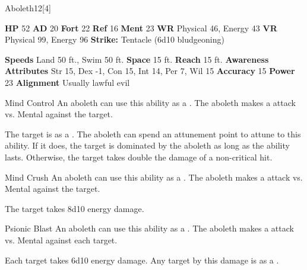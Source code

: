 \begin{monsection}{Aboleth}{12}[4]
    \begin{spellcontent}
      \begin{spelltargetinginfo}
        \pari \textbf{HP} 52 \monsep
          \textbf{AD} 20 \monsep
          \textbf{Fort} 22 \monsep
          \textbf{Ref} 16 \monsep
          \textbf{Ment} 23
        \pari \textbf{WR} Physical 46, Energy 43 \monsep
        \textbf{VR} Physical 99, Energy 96
        \pari \textbf{Strike:}
            Tentacle  (6d10 bludgeoning)
      \end{spelltargetinginfo}
    \end{spellcontent}
    \begin{monsterfooter}
      \pari \textbf{Speeds} Land 50 ft., Swim 50 ft. \monsep
        \textbf{Space} 15 ft. \monsep
        \textbf{Reach} 15 ft.
      \pari \textbf{Awareness} 
      \pari \textbf{Attributes}
        Str 15, Dex -1,
        Con 15, Int 14,
        Per 7, Wil 15
      \pari \textbf{Accuracy} 15 \monsep
        \textbf{Power} 23
      \pari \textbf{Alignment} Usually lawful evil
    \end{monsterfooter}
  \end{monsection}
  \begin{freeability}{Mind Control}
      An aboleth can use this ability as a . The aboleth makes a  attack
        vs. Mental against the target.
    
    \hit The target is  as a .
    \crit 
        The aboleth can spend an attunement point to attune to this ability.
        If it does, the target is dominated by the aboleth as long as the ability lasts.
        Otherwise, the target takes double the damage of a non-critical hit.
    \end{freeability}
  

    \begin{freeability}{Mind Crush}
      An aboleth can use this ability as a . The aboleth makes a  attack
        vs. Mental against the target.
    
    \hit The target takes 8d10 energy damage.
    \end{freeability}
  

    \begin{freeability}{Psionic Blast}
      An aboleth can use this ability as a . The aboleth makes a  attack
        vs. Mental against each target.
    
    \hit Each target takes 6d10 energy damage. Any target  by this damage is  as a .
    \end{freeability}
  
